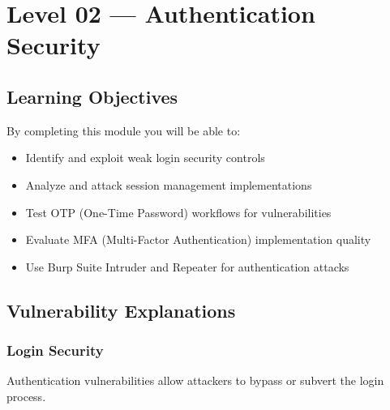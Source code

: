 \chapter{Level 02 — Authentication Security}
\label{ch:level02}


\section{Learning Objectives}

By completing this module you will be able to:
\begin{itemize}
  \item Identify and exploit weak login security controls
  \item Analyze and attack session management implementations
  \item Test OTP (One-Time Password) workflows for vulnerabilities
  \item Evaluate MFA (Multi-Factor Authentication) implementation quality
  \item Use Burp Suite Intruder and Repeater for authentication attacks
\end{itemize}

\section{Vulnerability Explanations}

\subsection{Login Security}

Authentication vulnerabilities allow attackers to bypass or subvert the login process.

